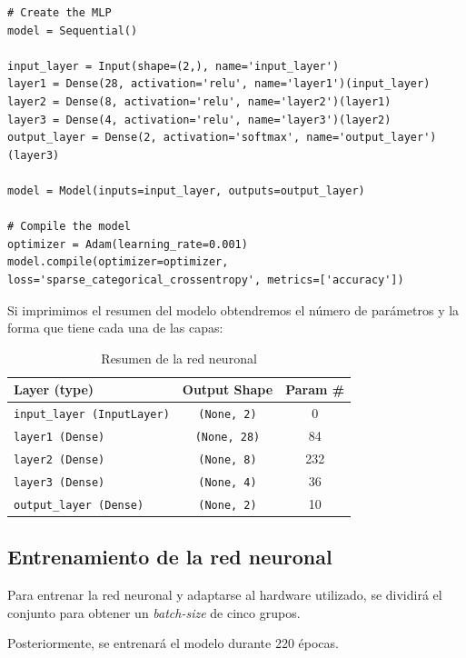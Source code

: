 \documentclass[paper=a4, fontsize=11pt]{scrartcl} %
\numberwithin{equation}{section} %
\numberwithin{figure}{section} %
\numberwithin{table}{section} %
\begin{document}
\begin{verbatim}
# Create the MLP
model = Sequential()

input_layer = Input(shape=(2,), name='input_layer')
layer1 = Dense(28, activation='relu', name='layer1')(input_layer)
layer2 = Dense(8, activation='relu', name='layer2')(layer1)
layer3 = Dense(4, activation='relu', name='layer3')(layer2)
output_layer = Dense(2, activation='softmax', name='output_layer')(layer3)

model = Model(inputs=input_layer, outputs=output_layer)

# Compile the model
optimizer = Adam(learning_rate=0.001)
model.compile(optimizer=optimizer, loss='sparse_categorical_crossentropy', metrics=['accuracy'])

\end{verbatim}

Si imprimimos el resumen del modelo obtendremos el número de parámetros y la forma que tiene cada una de las capas:

\begin{table}[H]
    \centering
    \begin{tabular}{@{}|l|c|c|@{}}
        \hline
        \textbf{Layer (type)} & \textbf{Output Shape} & \textbf{Param \#} \\ \hline
        \texttt{input\_layer (InputLayer)} & \texttt{(None, 2)} & 0 \\ \hline
        \texttt{layer1 (Dense)} & \texttt{(None, 28)} & 84 \\ \hline
        \texttt{layer2 (Dense)} & \texttt{(None, 8)} & 232 \\ \hline
        \texttt{layer3 (Dense)} & \texttt{(None, 4)} & 36 \\ \hline
        \texttt{output\_layer (Dense)} & \texttt{(None, 2)} & 10 \\ \hline
    \end{tabular}
    \caption{Resumen de la red neuronal}
    \label{tab:network_summary}
\end{table}


\subsection{Entrenamiento de la red neuronal}

Para entrenar la red neuronal y adaptarse al hardware utilizado, se dividirá el conjunto para obtener un \textit{batch-size} de cinco grupos.

Posteriormente, se entrenará el modelo durante 220 épocas.
\end{document}
